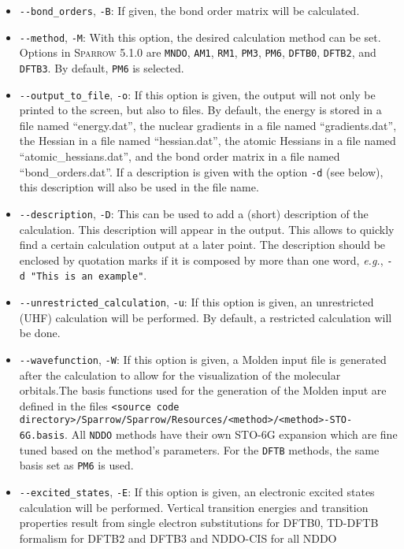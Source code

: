 \documentclass[]{tufte-book}
\begin{document}
\begin{itemize}
\item \texttt{-{}-bond\_orders}, \texttt{-B}: If given, the bond order matrix will be calculated.
\item \texttt{-{}-method}, \texttt{-M}: With this option, the desired calculation method can be set. Options in
\textsc{Sparrow} 5.1.0 are \texttt{MNDO}, \texttt{AM1}, \texttt{RM1}, \texttt{PM3}, \texttt{PM6}, \texttt{DFTB0}, \texttt{DFTB2}, and
\texttt{DFTB3}. By default, \texttt{PM6} is selected.
\item \texttt{-{}-output\_to\_file}, \texttt{-o}: If this option is given, the output will not only be printed to the screen, 
but also to files. By default, the energy is stored in a file named ``energy.dat'', the nuclear gradients in a file named
``gradients.dat'', the Hessian in a file named ``hessian.dat'', the atomic Hessians in a file named ``atomic\_hessians.dat'', and the
bond order matrix in a file named ``bond\_orders.dat''.
If a description is given with the option \texttt{-d} (see below), this description will also be used in the file name.
\item \texttt{-{}-description}, \texttt{-D}: This can be used to add a (short) description of the calculation. This
description will appear in the output. This allows to quickly find a certain calculation output at a later point. The
description should be enclosed by quotation marks if it is composed by more than one word, \textit{e.g.},
\texttt{-d "This is an example"}.
\item \texttt{-{}-unrestricted\_calculation}, \texttt{-u}: If this option is given, an unrestricted (UHF) calculation
will be performed. By default, a restricted calculation will be done.
\item \texttt{-{}-wavefunction}, \texttt{-W}: If this option is given, a Molden input file is generated after the
calculation to allow for the visualization of the molecular orbitals.The basis functions used for the generation of the
Molden input are defined in the files \texttt{<source code directory>/Sparrow/Sparrow/Resources/<method>/<method>-STO-6G.basis}.
All \texttt{NDDO} methods have their own STO-6G expansion which are fine tuned based on the method's parameters.
For the \texttt{DFTB} methods, the same basis set as \texttt{PM6} is used.
\item \texttt{-{}-excited\_states}, \texttt{-E}: If this option is given, an
  electronic excited states calculation will be performed. Vertical transition
    energies and transition properties result from single electron substitutions
    for DFTB0, TD-DFTB formalism for DFTB2 and DFTB3 and NDDO-CIS for all NDDO

\end{itemize}
\end{document}
